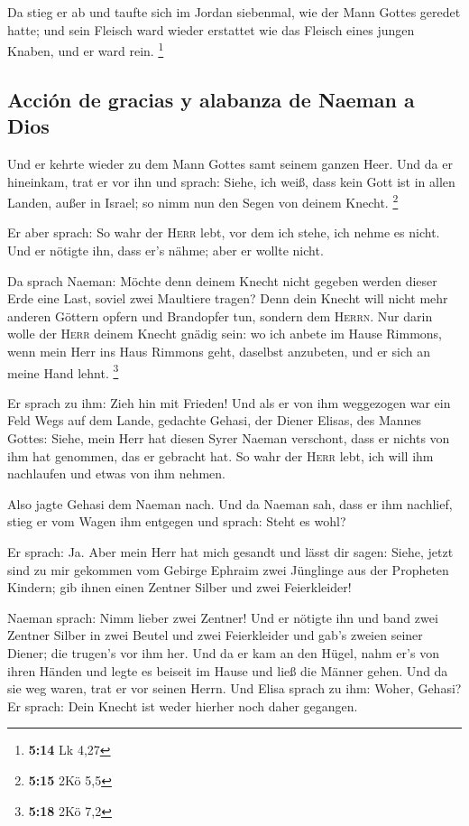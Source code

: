  Da stieg er ab und taufte sich im Jordan siebenmal, wie
der Mann Gottes geredet hatte; und sein Fleisch ward wieder erstattet
wie das Fleisch eines jungen Knaben, und er ward rein. \footnote{\textbf{5:14}
  Lk 4,27}

\hypertarget{acciuxf3n-de-gracias-y-alabanza-de-naeman-a-dios}{%
\subsection{Acción de gracias y alabanza de Naeman a
Dios}\label{acciuxf3n-de-gracias-y-alabanza-de-naeman-a-dios}}

 Und er kehrte wieder zu dem Mann Gottes samt seinem
ganzen Heer. Und da er hineinkam, trat er vor ihn und sprach: Siehe, ich
weiß, dass kein Gott ist in allen Landen, außer in Israel; so nimm nun
den Segen von deinem Knecht. \footnote{\textbf{5:15} 2Kö 5,5}

 Er aber sprach: So wahr der \textsc{Herr} lebt, vor dem
ich stehe, ich nehme es nicht. Und er nötigte ihn, dass er's nähme; aber
er wollte nicht.

 Da sprach Naeman: Möchte denn deinem Knecht nicht
gegeben werden dieser Erde eine Last, soviel zwei Maultiere tragen? Denn
dein Knecht will nicht mehr anderen Göttern opfern und Brandopfer tun,
sondern dem \textsc{Herrn}.  Nur darin wolle der
\textsc{Herr} deinem Knecht gnädig sein: wo ich anbete im Hause Rimmons,
wenn mein Herr ins Haus Rimmons geht, daselbst anzubeten, und er sich an
meine Hand lehnt. \footnote{\textbf{5:18} 2Kö 7,2}

 Er sprach zu ihm: Zieh hin mit Frieden! Und als er von
ihm weggezogen war ein Feld Wegs auf dem Lande,  gedachte
Gehasi, der Diener Elisas, des Mannes Gottes: Siehe, mein Herr hat
diesen Syrer Naeman verschont, dass er nichts von ihm hat genommen, das
er gebracht hat. So wahr der \textsc{Herr} lebt, ich will ihm nachlaufen
und etwas von ihm nehmen.

 Also jagte Gehasi dem Naeman nach. Und da Naeman sah,
dass er ihm nachlief, stieg er vom Wagen ihm entgegen und sprach: Steht
es wohl?

 Er sprach: Ja. Aber mein Herr hat mich gesandt und lässt
dir sagen: Siehe, jetzt sind zu mir gekommen vom Gebirge Ephraim zwei
Jünglinge aus der Propheten Kindern; gib ihnen einen Zentner Silber und
zwei Feierkleider!

 Naeman sprach: Nimm lieber zwei Zentner! Und er nötigte
ihn und band zwei Zentner Silber in zwei Beutel und zwei Feierkleider
und gab's zweien seiner Diener; die trugen's vor ihm her.
 Und da er kam an den Hügel, nahm er's von ihren Händen
und legte es beiseit im Hause und ließ die Männer gehen. 
Und da sie weg waren, trat er vor seinen Herrn. Und Elisa sprach zu ihm:
Woher, Gehasi? Er sprach: Dein Knecht ist weder hierher noch daher
gegangen.

